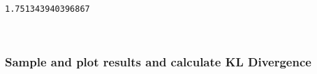 \documentclass[11pt]{article}
\begin{document}
    \begin{Verbatim}[commandchars=\\\{\}]
1.751343940396867

    \end{Verbatim}

    \begin{center}
    \end{center}
    { \hspace*{\fill} \\}
    
    \subsubsection{Sample and plot results and calculate KL
Divergence}\label{sample-and-plot-results-and-calculate-kl-divergence}
\end{document}
